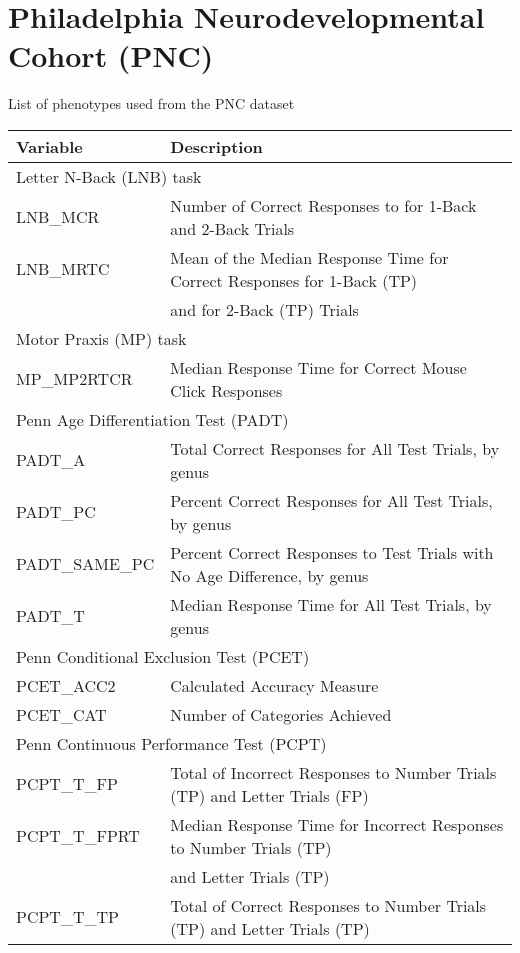 \documentclass{article}
\begin{document}
\section{Philadelphia Neurodevelopmental Cohort (PNC)}
List of phenotypes used from the PNC dataset
\begin{longtable}{ll}
\toprule
\textbf{Variable} & \textbf{Description}\\
\midrule
\multicolumn{2}{l}{Letter N-Back (LNB) task}\\
\midrule
LNB\_MCR & Number of Correct Responses to for 1-Back and 2-Back Trials\\
LNB\_MRTC & Mean of the Median Response Time for Correct Responses for 1-Back (TP)\\
& and for 2-Back (TP) Trials\\
\midrule
\multicolumn{2}{l}{Motor Praxis (MP) task}\\
\midrule
MP\_MP2RTCR & Median Response Time for Correct Mouse Click Responses\\
\midrule
\multicolumn{2}{l}{Penn Age Differentiation Test (PADT)}\\
\midrule
PADT\_A & Total Correct Responses for All Test Trials, by genus\\
PADT\_PC & Percent Correct Responses for All Test Trials, by genus\\
PADT\_SAME\_PC & Percent Correct Responses to Test Trials with No Age Difference, by genus\\
PADT\_T & Median Response Time for All Test Trials, by genus\\
\midrule
\multicolumn{2}{l}{Penn Conditional Exclusion Test (PCET)}\\
\midrule
PCET\_ACC2 & Calculated Accuracy Measure\\
PCET\_CAT & Number of Categories Achieved\\
\midrule
\multicolumn{2}{l}{Penn Continuous Performance Test (PCPT)}\\
\midrule
PCPT\_T\_FP & Total of Incorrect Responses to Number Trials (TP) and Letter Trials (FP)\\
PCPT\_T\_FPRT & Median Response Time for Incorrect Responses to Number Trials (TP)\\
& and Letter Trials (TP)\\
PCPT\_T\_TP & Total of Correct Responses to Number Trials (TP) and Letter Trials (TP)\\

\end{longtable}
\end{document}
